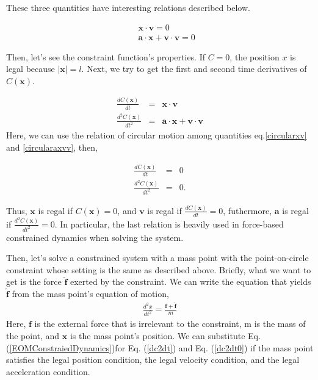 \documentclass[pdflatex,sn-mathphys-num]{sn-jnl}%
\theoremstyle{thmstyleone}%
\theoremstyle{thmstyletwo}%
\theoremstyle{thmstylethree}%
\begin{document}
These three quantities have interesting relations described below.

\begin{eqnarray}
	& &\boldsymbol{x} \cdot  \boldsymbol{v} = 0\label{circularxv}\\
	& &\boldsymbol{a} \cdot  \boldsymbol{x} + \boldsymbol{v} \cdot \boldsymbol{v}= 0\label{circularaxvv}
\end{eqnarray}

Then, let's see the constraint function's properties.
If $C = 0$, the position $x$ is legal because $|\boldsymbol{x}| = l$.
Next, we try to get the first and second time derivatives of $C(\boldsymbol{x})$.

\begin{eqnarray}
	\frac{dC(\boldsymbol{x})}{dt} &=& \boldsymbol{x} \cdot \boldsymbol{v}\\
	\frac{d^2C(\boldsymbol{x})}{dt^2} &=&  \boldsymbol{a} \cdot \boldsymbol{x} + \boldsymbol{v} \cdot \boldsymbol{v}\label{dc2dt}
\end{eqnarray}
Here, we can use the relation of circular motion among quantities eq.\ref{circularxv} and \ref{circularaxvv}, then,

\begin{eqnarray}
	\frac{dC(\boldsymbol{x})}{dt} &=& 0\\
	\frac{d^2C(\boldsymbol{x})}{dt^2} &=& 0.\label{dc2dt0}
\end{eqnarray}

Thus, $\boldsymbol{x}$ is regal if $C(\boldsymbol{x}) = 0$, and $\boldsymbol{v}$ is regal if $\frac{dC(\boldsymbol{x})}{dt} = 0$, futhermore, $\boldsymbol{a}$ is regal if $\frac{d^2C(\boldsymbol{x})}{dt^2} = 0$. In particular, the last relation is heavily used in force-based constrained dynamics when solving the system.

Then, let's solve a constrained system with a mass point with the point-on-circle constraint whose setting is the same as described above.
Briefly, what we want to get is the force $\boldsymbol{\hat{f}}$ exerted by the constraint. We can write the equation that yields $\boldsymbol{\hat{f}}$ from the mass point's equation of motion,
\begin{eqnarray}
	\frac{d^2 x}{dt^2} = \frac{\boldsymbol{f}+\boldsymbol{\hat{f}}}{m}\label{EOMConstraiedDynamics}
\end{eqnarray}
Here, $\boldsymbol{f}$ is the external force that is irrelevant to the constraint, m is the mass of the point, and $\boldsymbol{x}$ is the mass point's position. We can substitute Eq. (\ref{EOMConstraiedDynamics})for Eq. (\ref{dc2dt}) and Eq. (\ref{dc2dt0}) if the mass point satisfies the legal position condition, the legal velocity condition, and the legal acceleration condition.
\end{document}
